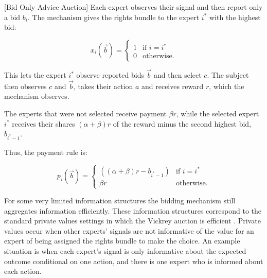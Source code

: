 \begin{mech}\label{mech:BidOnly}[Bid Only Advice Auction]
 	Each expert observes their signal and then report only a bid $b_i$. The mechanism gives the rights bundle to the expert $i^*$ with the highest bid:
 	
 	   $$x_i(\vec{b}) = \begin{cases} 1 & \text{if } i = i^* \\ 0 & \text{otherwise.} \end{cases}$$
	
 	
 	This lets the expert $i^*$ observe reported bids $\vec{b}$ and then select $c$.
 	The subject then observes $c$ and $\vec{b}$, takes their action $a$ and receives reward $r$, which the mechanism observes. 
 	
 	The experts that were not selected receive  payment $\beta r$, while the selected expert $i^*$ receives their shares $(\alpha + \beta) r$ of the reward minus the second highest bid, $b_{i^*-1}$.
 	
 	Thus, the payment rule is:
 	
 	$$p_i(\vec b)= \begin{cases} ((\alpha + \beta)r - b_{i^*-1})& \text{if }i = i^* \\ \beta r & \text{otherwise.} \end{cases}$$

 \end{mech}
 
 For some very limited information structures the bidding mechanism still aggregates information efficiently. 
 These information structures correspond to the standard private values settings in which the Vickrey auction is efficient \cite{vickrey1961}.
 Private values occur when other experts' signals are not informative of the value for an expert of being assigned the rights bundle to make the choice.%
 An example situation is when each expert's signal is only informative about the expected outcome conditional on one action, and  there is one expert who is informed about each action.
 
